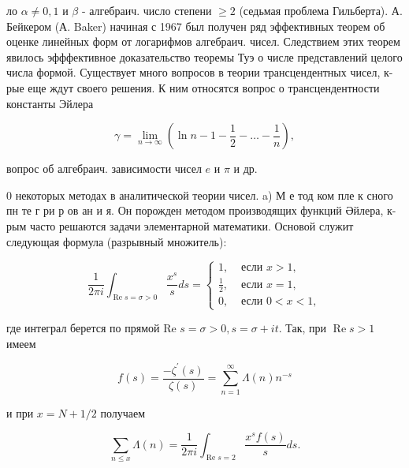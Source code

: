 \documentclass[10pt]{article}
\begin{document}
ло $\alpha \neq 0,1$ и $\beta$ - алгебраич. число степени $\geqslant 2$ (седьмая проблема Гильберта). А. Бейкером (А. Baker) начиная с 1967 был получен ряд эффективных теорем об оценке линейных форм от логарифмов алгебраич. чисел. Следствием этих теорем явилось эфффективное доказательство теоремы Туэ о числе представлений целого числа формой. Существует много вопросов в теории трансцендентных чисел, к-рые еще ждут своего решения. К ним относятся вопрос о трансцендентности константы Эйлера



\[

\gamma=\lim _{n \rightarrow \infty}\left(\ln n-1-\frac{1}{2}-\ldots-\frac{1}{n}\right),

\]



вопрос об алгебраич. зависимости чисел $e$ и $\pi$ и др.



0 некоторых методах в аналитической теории чисел. a) М е тод ком пле к сного пн те г ри р ов ан и я. Он порожден методом производящих функций Әйлера, к-рым часто решаются задачи элементарной математики. Основой служит следующая формула (разрывный множитель):



\[

\frac{1}{2 \pi i} \int_{\operatorname{Re} s=\sigma>0} \frac{x^{s}}{s} d s=\left\{\begin{array}{cl}

1, & \text { если } x>1, \\

\frac{1}{2}, & \text { если } x=1, \\

0, & \text { если } 0<x<1,

\end{array}\right.

\]



где интеграл берется по прямой Re $s=\sigma>0, s=\sigma+i t$. Так, при $\operatorname{Re} s>1$ имеем



\[

f(s)=\frac{-\zeta^{\prime}(s)}{\zeta(s)}=\sum_{n=1}^{\infty} \Lambda(n) n^{-s}

\]



и при $x=N+1 / 2$ получаем



\[

\sum_{n \leqslant x} \Lambda(n)=\frac{1}{2 \pi i} \int_{\operatorname{Re} s=2} \frac{x^{s} f(s)}{s} d s .

\]
\end{document}
